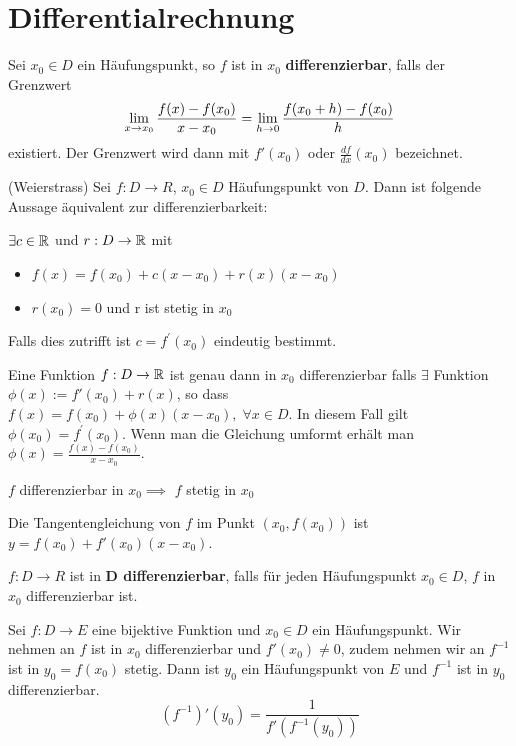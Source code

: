 \section{Differentialrechnung}



\begin{tcolorbox}
    Sei $x_0 \in D$ ein Häufungspunkt, so $f$ ist in $x_0$ \textbf{differenzierbar}, falls der Grenzwert
    $$\lim\limits_{x \to x_0} \frac{f(x) - f(x_0)}{x - x_0} = \lim\limits_{h \to 0} \frac{f(x_0 + h) - f(x_0)}{h}$$
    existiert. Der Grenzwert wird dann mit $f'(x_0)$ oder $\frac{df}{dx}(x_0)$ bezeichnet.
\end{tcolorbox}

\begin{tcolorbox}
	\Satz (Weierstrass) Sei $f: D \rightarrow R$, $x_{0} \in D$ Häufungspunkt von $D$. Dann ist folgende
    Aussage äquivalent zur differenzierbarkeit:

	$\exists c \in \mathbb{R}$ und $r: D \rightarrow \mathbb{R}$ mit
	\begin{itemize}
		\item{$f(x) = f(x_0) + c(x-x_0) + r(x)(x-x_0)$}
		\item{$r(x_0)=0$ und r ist stetig in $x_0$}
    \end{itemize}
	Falls dies zutrifft ist $c=f^{'}(x_0)$ eindeutig bestimmt. \bigskip

	\Satz Eine Funktion $f: D \rightarrow \mathbb{R}$ ist genau dann in $x_0$ differenzierbar falls $\exists$ 
    Funktion $\phi(x) := f'(x_0) + r(x)$, so dass $f(x) = f(x_0) + \phi(x)(x-x_0), \; \forall x \in D$. 
    In diesem Fall gilt $\phi(x_0) = f^{'}(x_0)$. Wenn man die Gleichung umformt erhält man $\phi(x)
    = \frac{f(x) - f(x_0)}{x - x_0}$.
\end{tcolorbox}

\Kor $f$ differenzierbar in $x_0 \implies$ $f$ stetig in $x_0$ 

\Bem Die Tangentengleichung von $f$ im Punkt $(x_0, f(x_0))$ ist $y = f(x_0) + f'(x_0)(x - x_0)$.

\begin{tcolorbox}
    $f : D \to R$ ist in \textbf{$\mathbf{D}$ differenzierbar}, falls für jeden Häufungspunkt $x_0 \in D$,
    $f$ in $x_0$ differenzierbar ist.
\end{tcolorbox}

\Kor Sei $f: D \to E$ eine bijektive Funktion und $x_0 \in D$ ein Häufungspunkt. Wir nehmen an $f$ ist
in $x_0$ differenzierbar und $f'(x_0) \neq 0$, zudem nehmen wir an $f^{-1}$ ist in $y_0 = f(x_0)$
stetig. Dann ist $y_0$ ein Häufungspunkt von $E$ und $f^{-1}$ ist in $y_0$ differenzierbar.
$$(f^{-1})'(y_0) = \frac{1}{f'(f^{-1}(y_0))}$$

